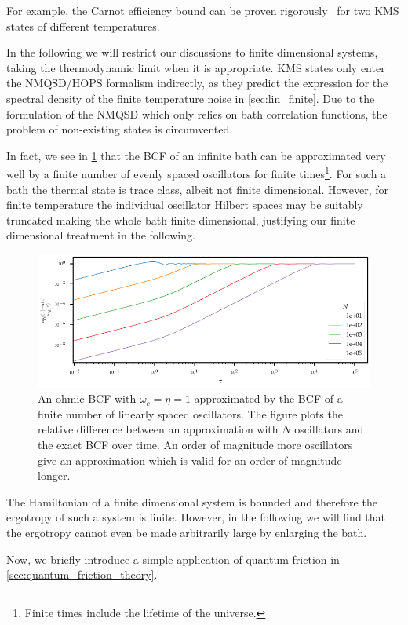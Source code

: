 For example, the Carnot efficiency bound can be proven
rigorously~\cite{Pusz1978Oct} for two KMS states of different
temperatures.

In the following we will restrict our discussions to finite
dimensional systems, taking the thermodynamic limit when it is
appropriate. KMS states only enter the NMQSD/HOPS formalism
indirectly, as they predict the expression for the spectral density of
the finite temperature noise in \cref{sec:lin_finite}. Due to the
formulation of the NMQSD which only relies on bath correlation
functions, the problem of non-existing states is circumvented.

In fact, we see in \cref{fig:bcf_approx} that the BCF of an infinite
bath can be approximated very well by a finite number of evenly spaced
oscillators for finite times\footnote{Finite times include the
  lifetime of the universe.}. For such a bath the thermal state is
trace class, albeit not finite dimensional. However, for finite
temperature the individual oscillator Hilbert spaces may be suitably
truncated making the whole bath finite dimensional, justifying our
finite dimensional treatment in the following.
\begin{figure}[htp]
  \centering
  \includegraphics{figs/misc/bcf_approx}
  \caption{\label{fig:bcf_approx} An ohmic BCF with \(ω_{c}=η=1\)
    approximated by the BCF of a finite number of linearly spaced
    oscillators. The figure plots the relative difference between an
    approximation with \(N\) oscillators and the exact BCF over
    time. An order of magnitude more oscillators give an approximation
    which is valid for an order of magnitude longer.}
\end{figure}

The Hamiltonian of a finite dimensional system is bounded and
therefore the ergotropy of such a system is finite. However, in the
following we will find that the ergotropy cannot even be made
arbitrarily large by enlarging the bath.

Now, we briefly introduce a simple application of quantum friction in
\cref{sec:quantum_friction_theory}.

